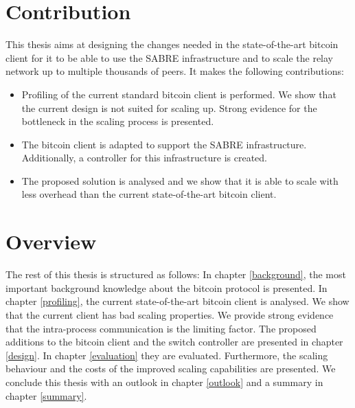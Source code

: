 \section{\label{introduction:goal}Contribution}
This thesis aims at designing the changes needed in the state-of-the-art bitcoin client for it to be able to use the SABRE infrastructure and to scale the relay network up to multiple thousands of peers. It makes the following contributions:
\begin{itemize}
	\item Profiling of the current standard bitcoin client is performed. We show that the current design is not suited for scaling up. Strong evidence for the bottleneck in the scaling process is presented.
	\item The bitcoin client is adapted to support the SABRE infrastructure. Additionally, a controller for this infrastructure is created.
	\item The proposed solution is analysed and we show that it is able to scale with less overhead than the current state-of-the-art bitcoin client.
\end{itemize}

\section{\label{introduction:overview}Overview}
The rest of this thesis is structured as follows: In chapter \ref{background}, the most important background knowledge about the bitcoin protocol is presented. In chapter \ref{profiling}, the current state-of-the-art bitcoin client is analysed. We show that the current client has bad scaling properties. We provide strong evidence that the intra-process communication is the limiting factor. The proposed additions to the bitcoin client and the switch controller are presented in chapter \ref{design}. In chapter \ref{evaluation} they are evaluated. Furthermore, the scaling behaviour and the costs of the improved scaling capabilities are presented. We conclude this thesis with an outlook in chapter \ref{outlook} and a summary in chapter \ref{summary}.

